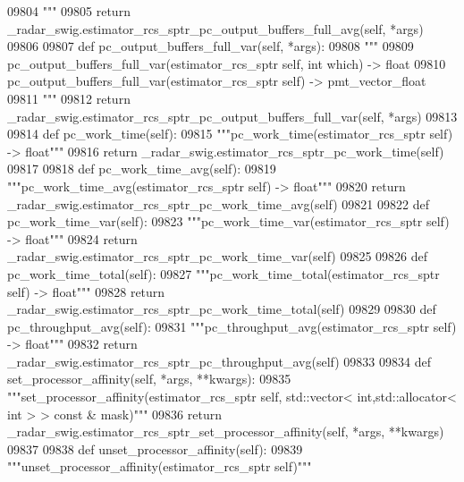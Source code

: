 \begin{DoxyCode}
{{{{{{{{{{{{{{{{{{{{{{{{{{{{{{{09804 \textcolor{stringliteral}{        """}
09805         \textcolor{keywordflow}{return} \_radar\_swig.estimator\_rcs\_sptr\_pc\_output\_buffers\_full\_avg(self, *args)
09806 
09807     \textcolor{keyword}{def }pc_output_buffers_full_var(self, *args):
09808         \textcolor{stringliteral}{"""}
09809 \textcolor{stringliteral}{        pc\_output\_buffers\_full\_var(estimator\_rcs\_sptr self, int which) -> float}
09810 \textcolor{stringliteral}{        pc\_output\_buffers\_full\_var(estimator\_rcs\_sptr self) -> pmt\_vector\_float}
09811 \textcolor{stringliteral}{        """}
09812         \textcolor{keywordflow}{return} \_radar\_swig.estimator\_rcs\_sptr\_pc\_output\_buffers\_full\_var(self, *args)
09813 
09814     \textcolor{keyword}{def }pc_work_time(self):
09815         \textcolor{stringliteral}{"""pc\_work\_time(estimator\_rcs\_sptr self) -> float"""}
09816         \textcolor{keywordflow}{return} \_radar\_swig.estimator\_rcs\_sptr\_pc\_work\_time(self)
09817 
09818     \textcolor{keyword}{def }pc_work_time_avg(self):
09819         \textcolor{stringliteral}{"""pc\_work\_time\_avg(estimator\_rcs\_sptr self) -> float"""}
09820         \textcolor{keywordflow}{return} \_radar\_swig.estimator\_rcs\_sptr\_pc\_work\_time\_avg(self)
09821 
09822     \textcolor{keyword}{def }pc_work_time_var(self):
09823         \textcolor{stringliteral}{"""pc\_work\_time\_var(estimator\_rcs\_sptr self) -> float"""}
09824         \textcolor{keywordflow}{return} \_radar\_swig.estimator\_rcs\_sptr\_pc\_work\_time\_var(self)
09825 
09826     \textcolor{keyword}{def }pc_work_time_total(self):
09827         \textcolor{stringliteral}{"""pc\_work\_time\_total(estimator\_rcs\_sptr self) -> float"""}
09828         \textcolor{keywordflow}{return} \_radar\_swig.estimator\_rcs\_sptr\_pc\_work\_time\_total(self)
09829 
09830     \textcolor{keyword}{def }pc_throughput_avg(self):
09831         \textcolor{stringliteral}{"""pc\_throughput\_avg(estimator\_rcs\_sptr self) -> float"""}
09832         \textcolor{keywordflow}{return} \_radar\_swig.estimator\_rcs\_sptr\_pc\_throughput\_avg(self)
09833 
09834     \textcolor{keyword}{def }set_processor_affinity(self, *args, **kwargs):
09835         \textcolor{stringliteral}{"""set\_processor\_affinity(estimator\_rcs\_sptr self, std::vector< int,std::allocator< int > > const &
       mask)"""}
09836         \textcolor{keywordflow}{return} \_radar\_swig.estimator\_rcs\_sptr\_set\_processor\_affinity(self, *args, **kwargs)
09837 
09838     \textcolor{keyword}{def }unset_processor_affinity(self):
09839         \textcolor{stringliteral}{"""unset\_processor\_affinity(estimator\_rcs\_sptr self)"""}
}}}}}}}}}}}}}}}}}}}}}}}}}}}}}}}
\end{DoxyCode}
